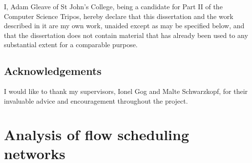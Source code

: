 \documentclass[12pt,a4paper,twoside,notitlepage]{report}
\theoremstyle{plain}
\theoremstyle{definition}
\theoremstyle{remark}
\begin{document}
I, Adam Gleave of St John's College, being a candidate for Part II of the 
Computer Science Tripos, hereby declare that this dissertation and the work 
described in it are my own work, unaided except as may be specified below, and
that the dissertation does not contain material that has already been used to
any substantial extent for a comparable purpose.

\bigskip
{}
\medskip

\clearpage

\tableofcontents

\listofalgorithms
\listoftables
\listoffigures

\newpage
\section*{Acknowledgements}

I would like to thank my supervisors, Ionel Gog and Malte Schwarzkopf, for their invaluable advice and encouragement throughout the project.

\clearpage	%

\setcounter{page}{1}
\pagestyle{headings}



\cleardoublepage


\cleardoublepage


\cleardoublepage


\cleardoublepage


\cleardoublepage

\printbibliography[heading=bibintoc,category=cited]

\printbibliography[title={WARNING: Uncited},notcategory=cited]


\appendix
\chapter{Analysis of flow scheduling networks} \label{appendix:flow-scheduling}

\end{document}
